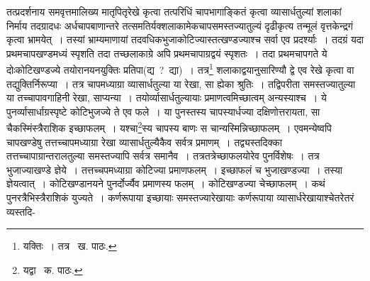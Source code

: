 \documentclass[11pt, openany]{book}
\begin{document}
\noindent तत्प्रदर्शनाय समवृत्तमालिख्य मातृपितृरेखे कृत्वा तत्परिधिं चापभागाङ्कितं कृत्वा व्यासार्धतुल्यां शलाकां निर्माय तदग्रादधः अर्धचापबाणान्तरे तत्समतिर्यक्शलाकामेकचापसमस्तज्यातुल्यं दृढीकृत्य तन्मूलं वृत्तकेन्द्रगं कृत्वा भ्रामयेत्~। तस्यां भ्राम्यमाणायां तदवधिकभुजाकोटिज्यास्तत्खण्डज्याश्च सर्वा एव प्रदर्श्याः~। तदग्रं यदा प्रथमचापखण्डमध्यं स्पृशति तदा तच्छलाकाग्रे अपि प्रथमचापाग्रद्वयं स्पृशतः~। तदा प्रथमचापगते ये दोःकोटिखण्डज्ये तयोरानयनयुक्तिः प्रतिपा(द्य~?~द्या)~। तत्र\renewcommand{\thefootnote}{१}\footnote{यक्तिः~। तत्र \textendash\ ख. पाठः.} शलाकाद्वयानुसारिण्यौ द्वे एव रेखे कृत्वा वा तद्युक्तिर्निरूप्या~। तत्र चापमध्याग्रा व्यासार्धतुल्या या रेखा, सा ह्येका श्रुतिः~। तद्विपरीता समस्तज्यातुल्या या तच्चापावगाहिनी रेखा, साप्यन्या~। तयोर्व्यासार्धतुल्यायाः प्रमाणत्वमिच्छात्वम् अन्यस्याश्च~। ये पुनर्व्यासार्धाग्रस्पृष्टे कोटिभुजज्ये ते एव फले~। या पुनस्तस्य चापस्यार्धज्या दक्षिणोत्तरायता, सा चैकस्मिंस्त्रैराशिक इच्छाफलम्~। यश्चा\renewcommand{\thefootnote}{२}\footnote{यद्वा \textendash\ क. पाठः.}स्य चापस्य बाणः स चान्यस्मिन्निच्छाफलम्~। एवमन्येष्वपि चापखण्डेषु तत्तच्चापमध्याग्रा रेखा व्यासार्धतुल्यैकैव सर्वत्र प्रमाणम्~। तद्व्यस्तदिक्का तत्तच्चापाग्रान्तरालतुल्या समस्तज्यापि सर्वत्र समानैव~। तत्रतत्रेच्छाफलयोरेव पुनर्विशेषः~। तत्र भुजाज्याखण्डे ज्ञेये~। तत्तच्चपमध्याग्रा कोटिज्या प्रमाणफलम्~। इच्छाफलं च भुजाखण्डज्या~। तस्या ज्ञेयत्वात्~। कोटिखण्डानयने पुनर्दोर्ज्यैव प्रमाणस्य फलम्~। कोटिखण्डज्या चेच्छाफलम्~। कथं पुनरत्रैभिस्त्रैराशिकं युज्यते~। कर्णरूपाया इच्छायाः समस्तज्यारेखायाः कर्णरूपाया व्यासार्धरेखायाश्चेतरेतरं व्यस्तदि-

\newpage
\end{document}
